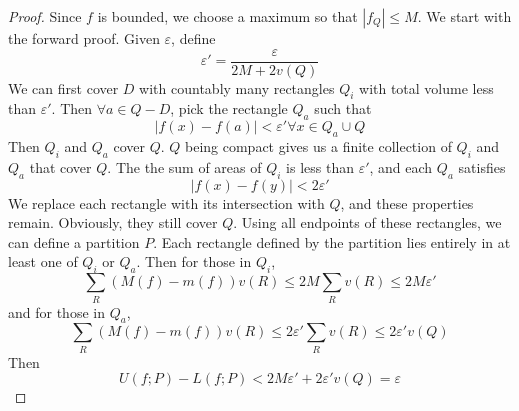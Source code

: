 \documentclass[12pt]{article}
\begin{document}
\begin{proof}
    Since $f$ is bounded, we choose a maximum so that $|f_Q| \leq M$. We start with the forward proof. Given $\varepsilon$, define
    $$\varepsilon' = \frac{\varepsilon}{2M + 2v(Q)}$$
    We can first cover $D$ with countably many rectangles $Q_i$ with total volume less than $\varepsilon'$. Then $\forall a \in Q - D$, pick the rectangle $Q_a$ such that
    $$|f(x) - f(a)| < \varepsilon' \forall x \in Q_a \cup Q$$
    Then $Q_i$ and $Q_a$ cover $Q$. $Q$ being compact gives us a finite collection of $Q_i$ and $Q_a$ that cover $Q$. The the sum of areas of $Q_i$ is less than $\varepsilon'$, and each $Q_a$ satisfies
    $$|f(x) - f(y)| < 2\varepsilon'$$
    We replace each rectangle with its intersection with $Q$, and these properties remain. Obviously, they still cover $Q$. Using all endpoints of these rectangles, we can define a partition $P$. Each rectangle defined by the partition lies entirely in at least one of $Q_i$ or $Q_a$. Then for those in $Q_i$,
    $$\sum_R (M(f) - m(f))v(R) \leq 2M\sum_R v(R) \leq 2M\varepsilon'$$
    and for those in $Q_a$,
    $$\sum_R (M(f) - m(f))v(R) \leq 2\varepsilon' \sum_R v(R) \leq 2\varepsilon' v(Q)$$
    Then
    $$U(f;P) - L(f;P) < 2M\varepsilon' + 2\varepsilon' v(Q) = \varepsilon$$
\end{proof}
\end{document}
